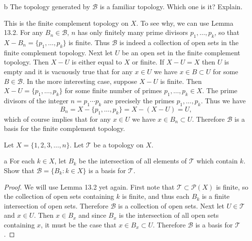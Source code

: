 \documentclass[11pt]{article}
\begin{document}
\begin{p}{b}
  The topology generated by $\mathcal{B}$ is a familiar topology. Which one is
  it? Explain.
\end{p}

\begin{solution}
  This is the finite complement topology on $X$. To see why, we can use Lemma
  13.2. For any $B_n \in \mathcal{B}$, $n$ has only finitely many prime
  divisors $p_1,\ldots,p_k$, so that $X - B_n = \{p_1,\ldots,p_k\}$ is finite.
  Thus $\mathcal{B}$ is indeed a collection of open sets in the finite
  complement topology. Next let $U$ be an open set in the finite complement
  topology. Then $X - U$ is either equal to $X$ or finite. If $X - U = X$ then
  $U$ is empty and it is vacuously true that for any $x \in U$ we have $x \in B \subset U$ for
  some $B \in \mathcal{B}$. In the more interesting case, suppose $X - U$ is
  finite. Then $X - U = \{p_1, \ldots, p_k \}$ for some finite number of primes
  $p_1,\ldots,p_k \in X$. The prime divisors of the integer $n = p_1 \cdots
  p_k$ are precisely the primes $p_1,\ldots,p_k$. Thus we have
  \[ B_n = X - \{p_1, \ldots, p_k\} = X - (X - U) = U,\]
  which of course implies that for any $x \in U$ we have $x \in B_n \subset U$.
  Therefore $\mathcal{B}$ is a basis for the finite complement topology.
\end{solution}


\noindent Let $X = \{1, 2, 3, \ldots, n\}.$ Let $\mathcal{T}$ be a topology on $X$.

\begin{p}{a}
  For each $k \in X$, let $B_k$ be the intersection of all elements of $\mathcal{T}$
  which contain $k$. Show that $\mathcal{B} = \{B_k : k \in X\}$ is a basis for
  $\mathcal{T}$.
\end{p}

\begin{proof}
  We will use Lemma 13.2 yet again. First note that $\mathcal{T} \subset
  \mathcal{P}(X)$ is finite, so the collection of open sets containing $k$ is
  finite, and thus each $B_k$ is a finite intersection of open sets. Therefore
  $\mathcal{B}$ is a collection of open sets. Next let $U \in \mathcal{T}$ and
  $x \in U$. Then $x \in B_x$ and since $B_x$ is the intersection of all open
  sets containing $x$, it must be the case that $x \in B_x \subset U$. Therefore
  $\mathcal{B}$ is a basis for $\mathcal{T}$.
\end{proof}
\end{document}

